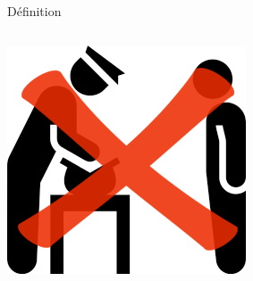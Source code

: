 \documentclass[xcolor=dvipsnames]{beamer}
\begin{document}
\begin{frame}{Définition}
\begin{columns}
    	\begin{column}{0.48\textwidth}
    		\begin{center}
				\includegraphics[scale=0.25]{control.png} 
			\end{center}
    	\end{column}
	\end{columns}

\end{frame}
\end{document}
